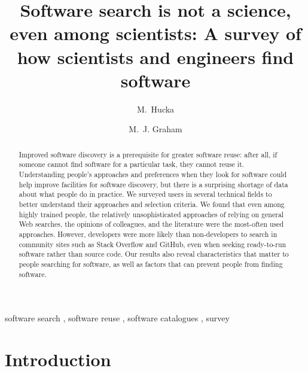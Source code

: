 \documentclass[review]{elsarticle}
\begin{document}
\begin{frontmatter}

\title{Software search is not a science, even among scientists: A survey of how scientists and engineers find software}

\author[cms]{M.~Hucka}
\author[astro]{M.~J. Graham}

\address[cms]{Department of Computing and Mathematical Sciences, Mail Code 306-15, California Institute of Technology, Pasadena, California 91125, USA}

\address[astro]{Department of Astronomy, Mail Code 158-79, California Institute of Technology, Pasadena, California 91125, USA}



\begin{abstract}
  Improved software discovery is a prerequisite for greater software reuse: after all, if someone cannot find software for a particular task, they cannot reuse it.  Understanding people's approaches and preferences when they look for software could help improve facilities for software discovery, but there is a surprising shortage of data about what people do in practice.  We surveyed users in several technical fields to better understand their approaches and selection criteria.  We found that even among highly trained people, the relatively unsophisticated approaches of relying on general Web searches, the opinions of colleagues, and the literature were the most-often used approaches.  However, developers were more likely than non-developers to search in community sites such as Stack Overflow and GitHub, even when seeking ready-to-run software rather than source code.  Our results also reveal characteristics that matter to people searching for software, as well as factors that can prevent people from finding software.
\end{abstract}

\begin{keyword}
software search \sep
software reuse \sep
software catalogues \sep
survey
\end{keyword}

\end{frontmatter}


\section{Introduction}
\end{document}
